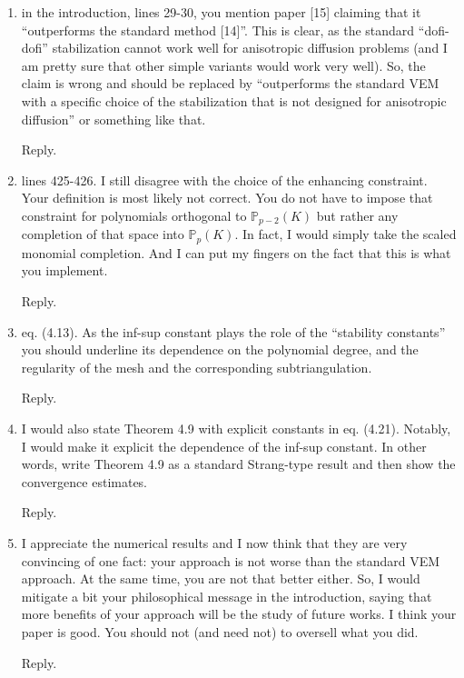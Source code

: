 \documentclass[10pt]{amsart}
\theoremstyle{definition}
\theoremstyle{remark}
\begin{document}
\begin{enumerate}[1.]
\item \textsf{in the introduction, lines 29-30, you mention paper [15] claiming that it ``outperforms the standard method [14]''. This is clear, as the standard ``dofi-dofi'' stabilization cannot work well for anisotropic diffusion problems (and I am pretty sure that other simple variants would work very well). So, the claim is wrong and should be replaced by ``outperforms the standard VEM with a specific choice of the stabilization that is not designed for anisotropic diffusion'' or something like that.}

\smallskip \noindent \textcolor[rgb]{1.00,0.00,0.00}{Reply.}


\medskip

\item \textsf{lines 425-426. I still disagree with the choice of the enhancing constraint. Your definition is most likely not correct. You do not have to impose that constraint for polynomials orthogonal to $\mathbb P_{p-2}(K)$ but rather any completion of that space into $\mathbb P_p(K)$. In fact, I would simply take the scaled monomial completion. And I can put my fingers on the fact that this is what you implement.}

\smallskip \noindent \textcolor[rgb]{1.00,0.00,0.00}{Reply.}



\medskip

\item \textsf{eq. (4.13). As the inf-sup constant plays the role of the ``stability constants'' you should underline its dependence on the polynomial degree, and the regularity of the mesh and the corresponding subtriangulation.}

\smallskip \noindent \textcolor[rgb]{1.00,0.00,0.00}{Reply.}


\medskip

\item \textsf{I would also state Theorem 4.9 with explicit constants in eq. (4.21). Notably, I would make it explicit the dependence of the inf-sup constant. In other words, write Theorem 4.9 as a standard Strang-type result and then show the convergence estimates.}

\smallskip \noindent \textcolor[rgb]{1.00,0.00,0.00}{Reply.}



\medskip

\item \textsf{I appreciate the numerical results and I now think that they are very convincing of one fact: your approach is not worse than the standard VEM approach. At the same time, you are not that better either. So, I would mitigate a bit your philosophical message in the introduction, saying that more benefits of your approach will be the study of future works. I think your paper is good. You should not (and need not) to oversell what you did.}

\smallskip \noindent \textcolor[rgb]{1.00,0.00,0.00}{Reply.}



\end{enumerate}
\end{document}
